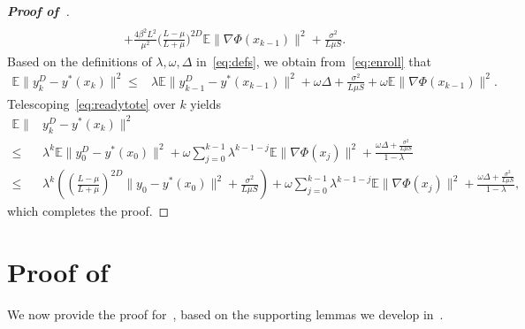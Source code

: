 \documentclass{osudissert96}
\begin{document}
\begin{proof}[\bf Proof of~]
{\begin{align}
\\&+\frac{4\beta^2L^2}{\mu^2} \Big(\frac{L-\mu}{L+\mu}\Big)^{2D} \mathbb{E}\|\nabla \Phi(x_{k-1})\|^2  + \frac{\sigma^2}{L\mu S}. 
\end{align}
}
\hspace{-0.15cm}Based on the definitions of $\lambda,\omega,\Delta$ in~\cref{eq:defs}, we obtain from~\cref{eq:enroll} that 
\begin{align}\label{eq:readytote}
\mathbb{E}\|y_k^{D}-y^*(x_k) \|^2 \leq& \lambda \mathbb{E}\|y^D_{k-1}-y^*(x_{k-1})\|^2 + \omega\Delta +\frac{\sigma^2}{L\mu S}  +\omega \mathbb{E}\|\nabla \Phi(x_{k-1})\|^2. 
\end{align}
Telescoping~\cref{eq:readytote} over $k$ yields
\begin{align*}
\mathbb{E}\|&y_k^{D}-y^*(x_k) \|^2 \nonumber
\\\leq & \lambda^{k} \mathbb{E}\|y_0^D-y^*(x_0)\|^2 + \omega\sum_{j=0}^{k-1}\lambda^{k-1-j} \mathbb{E}\|\nabla \Phi(x_j)\|^2 + \frac{\omega\Delta +\frac{\sigma^2}{L\mu S}}{1-\lambda} \nonumber
\\\leq&\lambda^{k} \left( \left(\frac{L-\mu}{L+\mu}\right)^{2D}\|y_0-y^*(x_0)\|^2 + \frac{\sigma^2}{L\mu S}\right) + \omega\sum_{j=0}^{k-1}\lambda^{k-1-j} \mathbb{E}\|\nabla \Phi(x_j)\|^2 + \frac{\omega\Delta +\frac{\sigma^2}{L\mu S}}{1-\lambda}, 
\end{align*}
which completes the proof. 
\end{proof}

\section{Proof of~}\label{mianshisimida}
We now provide the proof for~, based on the supporting lemmas we develop in~. 
\end{document}
